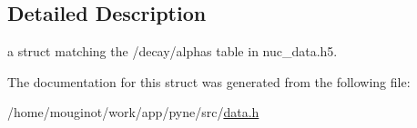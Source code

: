 \subsection{Detailed Description}
a struct matching the \textquotesingle{}/decay/alphas\textquotesingle{} table in nuc\+\_\+data.\+h5. 

The documentation for this struct was generated from the following file\+:\begin{DoxyCompactItemize}
\item 
/home/mouginot/work/app/pyne/src/\hyperlink{data_8h}{data.\+h}\end{DoxyCompactItemize}
